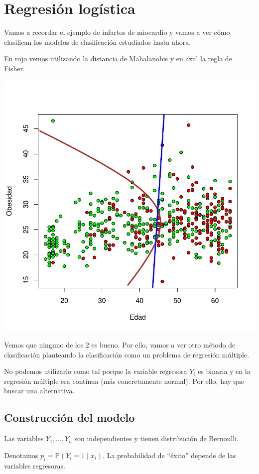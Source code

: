 \section{Regresión logística}

Vamos a recordar el ejemplo de infartos de miocardio y vamos a ver cómo clasifican los modelos de clasificación estudiados hasta ahora.

En rojo vemos utilizando la distancia de Mahalanobis y en azul la regla de Fisher.
\centerline{\includegraphics[width=13 cm]{pdf/tema4/_edadobesidad-reglas}}

Vemos que ninguno de los 2 es bueno. Por ello, vamos a ver otro método de clasificación planteando  la clasificación como un problema de regresión múltiple. 

No podemos utilizarlo como tal porque la variable regresora $Y_i$ es binaria y en la regresión múltiple era continua (más concretamente normal). Por ello, hay que buscar una alternativa.


\subsection{Construcción del modelo}
Las variables $Y_1,\ldots,Y_n$ son independientes y tienen distribución de Bernoulli. 

Denotamos $p_i=\mathbb{P}(Y_i=1 \mid x_i)$. La probabilidad de ``éxito'' depende de las variables regresoras.

